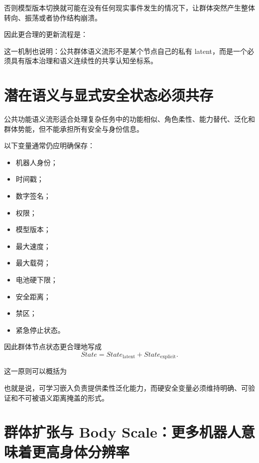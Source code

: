 否则模型版本切换就可能在没有任何现实事件发生的情况下，让群体突然产生整体转向、振荡或者协作结构崩溃。

因此更合理的更新流程是：
\begin{statementbox}
\centering
{}
\end{statementbox}

这一机制也说明：公共群体语义流形不是某个节点自己的私有 latent，而是一个必须具有版本治理和语义连续性的共享认知坐标系。


\section{潜在语义与显式安全状态必须共存}

公共功能语义流形适合处理复杂任务中的功能相似、角色柔性、能力替代、泛化和群体势能，但不能承担所有安全与身份信息。

以下变量通常仍应明确保存：
\begin{itemize}
    \item 机器人身份；
    \item 时间戳；
    \item 数字签名；
    \item 权限；
    \item 模型版本；
    \item 最大速度；
    \item 最大载荷；
    \item 电池硬下限；
    \item 安全距离；
    \item 禁区；
    \item 紧急停止状态。
\end{itemize}

因此群体节点状态更合理地写成
\[
State
=
State_{\mathrm{latent}}
+
State_{\mathrm{explicit}}.
\]

这一原则可以概括为
\begin{statementbox}
\centering
{}
\end{statementbox}

也就是说，可学习嵌入负责提供柔性泛化能力，而硬安全变量必须维持明确、可验证和不可被语义距离掩盖的形式。


\section{群体扩张与 Body Scale：更多机器人意味着更高身体分辨率}


